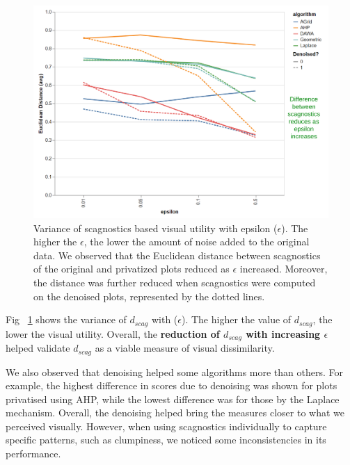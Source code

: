\documentclass[journal]{vgtc}                     %
\begin{document}
\begin{figure}[h]%
  \centering %
  \includegraphics[width=\linewidth]{figs/Score diff reducing with Epsilon.png}
  \caption{%
  	Variance of scagnostics based visual utility with epsilon ($\epsilon$). The higher the $\epsilon$, the lower the amount of noise added to the original data. We observed that the Euclidean distance between scagnostics of the original and privatized plots reduced as $\epsilon$ increased. Moreover, the distance was further reduced when scagnostics were computed on the denoised plots, represented by the dotted lines.%
  }
  \label{fig:diff_reducing_with_epsilon} 
\end{figure}
Fig ~\ref{fig:diff_reducing_with_epsilon} shows the variance of $d_{scag}$ with ($\epsilon$). The higher the value of $d_{scag}$, the lower the visual utility. Overall, the \textbf{reduction of $d_{scag}$ with increasing $\epsilon$} helped validate $d_{scag}$ as a viable measure of visual dissimilarity.
\par We also observed that denoising helped some algorithms more than others. For example, the highest difference in scores due to denoising was shown for plots privatised using AHP, while the lowest difference was for those by the Laplace mechanism. Overall, the denoising helped bring the measures closer to what we perceived visually. However, when using scagnostics individually to capture specific patterns, such as clumpiness, we noticed some inconsistencies in its performance.
\end{document}
